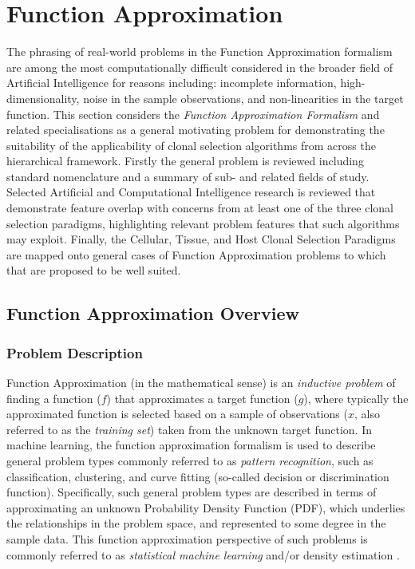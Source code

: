 %
%
\section{Function Approximation}
\label{sec:iidle:function:approximation}
The phrasing of real-world problems in the Function Approximation formalism are among the most computationally difficult considered in the broader field of Artificial Intelligence for reasons including: incomplete information, high-dimensionality, noise in the sample observations, and non-linearities in the target function.
This section considers the \emph{Function Approximation Formalism} and related specialisations as a general motivating problem for demonstrating the suitability of the applicability of clonal selection algorithms from across the hierarchical framework.
Firstly the general problem is reviewed including standard nomenclature and a summary of sub- and related fields of study. Selected Artificial and Computational Intelligence research is reviewed that demonstrate feature overlap with concerns from at least one of the three clonal selection paradigms, highlighting relevant problem features that such algorithms may exploit. Finally, the Cellular, Tissue, and Host Clonal Selection Paradigms are mapped onto general cases of Function Approximation problems to which that are proposed to be well suited.


%
%
\subsection{Function Approximation Overview}
\label{subsec:iidle:function:approximation:overview}

%
%
\subsubsection{Problem Description}
Function Approximation (in the mathematical sense) is an \emph{inductive problem} of finding a function ($f$) that approximates a target function ($g$), where typically the approximated function is selected based on a sample of observations ($x$, also referred to as the \emph{training set}) taken from the unknown target function.
In machine learning, the function approximation formalism is used to describe general problem types commonly referred to as \emph{pattern recognition}, such as classification, clustering, and curve fitting (so-called decision or discrimination function). Specifically, such general problem types are described in terms of approximating an unknown Probability Density Function (PDF), which underlies the relationships in the problem space, and represented to some degree in the sample data. This function approximation perspective of such problems is commonly referred to as \emph{statistical machine learning} and/or density estimation \cite{Fukunaga1990, Bishop1995}.

